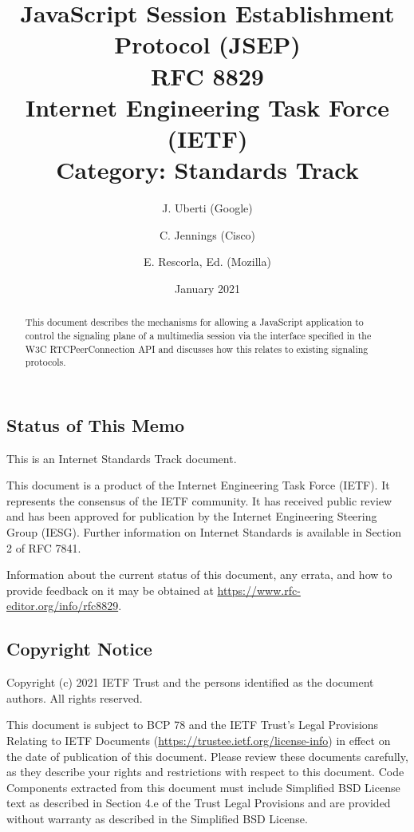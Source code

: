 \documentclass{article}
\title{JavaScript Session Establishment Protocol (JSEP)\\
\large RFC 8829\\
Internet Engineering Task Force (IETF)\\
Category: Standards Track}
\author{
J. Uberti (Google) \and
C. Jennings (Cisco) \and
E. Rescorla, Ed. (Mozilla)
}
\date{January 2021}
\begin{document}
\maketitle

\begin{abstract}
This document describes the mechanisms for allowing a JavaScript
application to control the signaling plane of a multimedia session
via the interface specified in the W3C RTCPeerConnection API and
discusses how this relates to existing signaling protocols.
\end{abstract}

\subsection*{Status of This Memo}

This is an Internet Standards Track document.

This document is a product of the Internet Engineering Task Force
(IETF).  It represents the consensus of the IETF community.  It has
received public review and has been approved for publication by the
Internet Engineering Steering Group (IESG).  Further information on
Internet Standards is available in Section 2 of RFC 7841.

Information about the current status of this document, any errata,
and how to provide feedback on it may be obtained at
\url{https://www.rfc-editor.org/info/rfc8829}.

\subsection*{Copyright Notice}

Copyright (c) 2021 IETF Trust and the persons identified as the
document authors.  All rights reserved.

This document is subject to BCP 78 and the IETF Trust's Legal
Provisions Relating to IETF Documents
(\url{https://trustee.ietf.org/license-info}) in effect on the date of
publication of this document.  Please review these documents
carefully, as they describe your rights and restrictions with respect
to this document.  Code Components extracted from this document must
include Simplified BSD License text as described in Section 4.e of
the Trust Legal Provisions and are provided without warranty as
described in the Simplified BSD License.

\tableofcontents
\newpage

\end{document}
